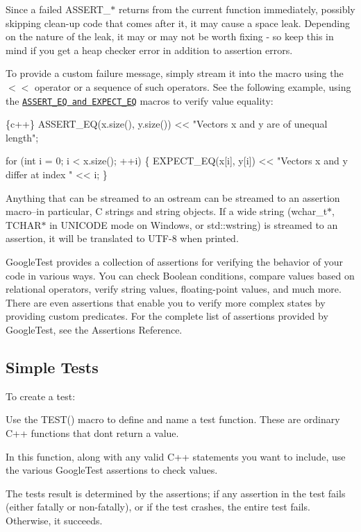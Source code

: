 Since a failed {\ttfamily A\+S\+S\+E\+R\+T\+\_\+$\ast$} returns from the current function immediately, possibly skipping clean-\/up code that comes after it, it may cause a space leak. Depending on the nature of the leak, it may or may not be worth fixing -\/ so keep this in mind if you get a heap checker error in addition to assertion errors.

To provide a custom failure message, simply stream it into the macro using the {\ttfamily $<$$<$} operator or a sequence of such operators. See the following example, using the \href{reference/assertions.md#EXPECT_EQ}{\tt {\ttfamily A\+S\+S\+E\+R\+T\+\_\+\+EQ} and {\ttfamily E\+X\+P\+E\+C\+T\+\_\+\+EQ}} macros to verify value equality\+:


\begin{DoxyCode}
\{c++\}
ASSERT\_EQ(x.size(), y.size()) << "Vectors x and y are of unequal length";

for (int i = 0; i < x.size(); ++i) \{
  EXPECT\_EQ(x[i], y[i]) << "Vectors x and y differ at index " << i;
\}
\end{DoxyCode}


Anything that can be streamed to an {\ttfamily ostream} can be streamed to an assertion macro--in particular, C strings and {\ttfamily string} objects. If a wide string ({\ttfamily wchar\+\_\+t$\ast$}, {\ttfamily T\+C\+H\+A\+R$\ast$} in {\ttfamily U\+N\+I\+C\+O\+DE} mode on Windows, or {\ttfamily std\+::wstring}) is streamed to an assertion, it will be translated to U\+T\+F-\/8 when printed.

Google\+Test provides a collection of assertions for verifying the behavior of your code in various ways. You can check Boolean conditions, compare values based on relational operators, verify string values, floating-\/point values, and much more. There are even assertions that enable you to verify more complex states by providing custom predicates. For the complete list of assertions provided by Google\+Test, see the Assertions Reference.

\subsection*{Simple Tests}

To create a test\+:


\begin{DoxyEnumerate}
\item Use the {\ttfamily T\+E\+S\+T()} macro to define and name a test function. These are ordinary C++ functions that don\textquotesingle{}t return a value.
\item In this function, along with any valid C++ statements you want to include, use the various Google\+Test assertions to check values.
\item The test\textquotesingle{}s result is determined by the assertions; if any assertion in the test fails (either fatally or non-\/fatally), or if the test crashes, the entire test fails. Otherwise, it succeeds.
\end{DoxyEnumerate}


